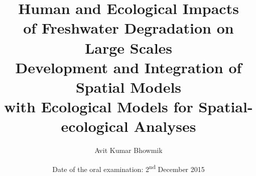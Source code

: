 \documentclass[10pt,showtrims,a4paper,twoside]{memoir} %
\title{\textbf{\Huge{Human and Ecological Impacts\\of Freshwater Degradation on Large Scales}}\\[.2cm]
\LARGE Development and Integration of Spatial Models\\with Ecological Models for Spatial-ecological Analyses} %
\author{Avit Kumar Bhowmik} %
\date{Date of the oral examination: 2\textsuperscript{nd} December 2015} %
\begin{document}
\begin{titlingpage}
\maketitle %
\end{titlingpage}

\frontmatter %


 


 


 


\tableofcontents* %

\openright



\newpage\null\thispagestyle{empty}\newpage %

\end{document}
